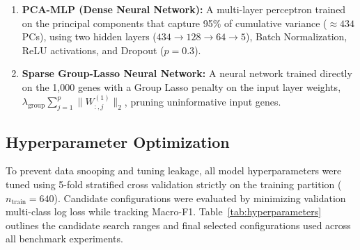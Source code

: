 \documentclass[11pt,a4paper]{article}
\begin{document}
\begin{enumerate}
    \item \textbf{PCA-MLP (Dense Neural Network):} A multi-layer perceptron trained on the principal components that capture 95\% of cumulative variance ($\approx 434$ PCs), using two hidden layers ($434 \to 128 \to 64 \to 5$), Batch Normalization, ReLU activations, and Dropout ($p = 0.3$).
    \item \textbf{Sparse Group-Lasso Neural Network:} A neural network trained directly on the 1,000 genes with a Group Lasso penalty on the input layer weights, $\lambda_{\text{group}} \sum_{j=1}^p \|W^{(1)}_{:, j}\|_2$, pruning uninformative input genes.
\end{enumerate}

\subsection{Hyperparameter Optimization}
To prevent data snooping and tuning leakage, all model hyperparameters were tuned using 5-fold stratified cross validation strictly on the training partition ($n_{\text{train}} = 640$). Candidate configurations were evaluated by minimizing validation multi-class log loss while tracking Macro-F1. Table~\ref{tab:hyperparameters} outlines the candidate search ranges and final selected configurations used across all benchmark experiments.
\end{document}
